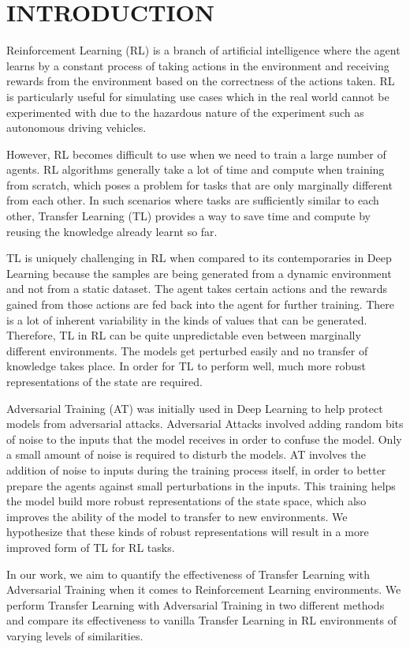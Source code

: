 
\chapter{INTRODUCTION} %

Reinforcement Learning (RL) is a branch of artificial intelligence where the agent learns by a constant process of taking actions in the environment and receiving rewards from the environment based on the correctness of the actions taken. RL is particularly useful for simulating use cases which in the real world cannot be experimented with due to the hazardous nature of the experiment such as autonomous driving vehicles.

However, RL becomes difficult to use when we need to train a large number of agents. RL algorithms generally take a lot of time and compute when training from scratch, which poses a problem for tasks that are only marginally different from each other. In such scenarios where tasks are sufficiently similar to each other, Transfer Learning (TL) provides a way to save time and compute by reusing the knowledge already learnt so far. 

TL is uniquely challenging in RL when compared to its contemporaries in Deep Learning because the samples are being generated from a dynamic environment and not from a static dataset. The agent takes certain actions and the rewards gained from those actions are fed back into the agent for further training. There is a lot of inherent variability in the kinds of values that can be generated. Therefore, TL in RL can be quite unpredictable even between marginally different environments. The models get perturbed easily and no transfer of knowledge takes place. In order for TL to perform well, much more robust representations of the state are required. 

Adversarial Training (AT) was initially used in Deep Learning to help protect models from adversarial attacks. Adversarial Attacks involved adding random bits of noise to the inputs that the model receives in order to confuse the model. Only a small amount of noise is required to disturb the models. AT involves the addition of noise to inputs during the training process itself, in order to better prepare the agents against small perturbations in the inputs. This training helps the model build more robust representations of the state space, which also improves the ability of the model to transfer to new environments. We hypothesize that these kinds of robust representations will result in a more improved form of TL for RL tasks.

In our work, we aim to quantify the effectiveness of Transfer Learning with Adversarial Training when it comes to Reinforcement Learning environments. We perform Transfer Learning with Adversarial Training in two different methods and compare its effectiveness to vanilla Transfer Learning in RL environments of varying levels of  similarities. 



